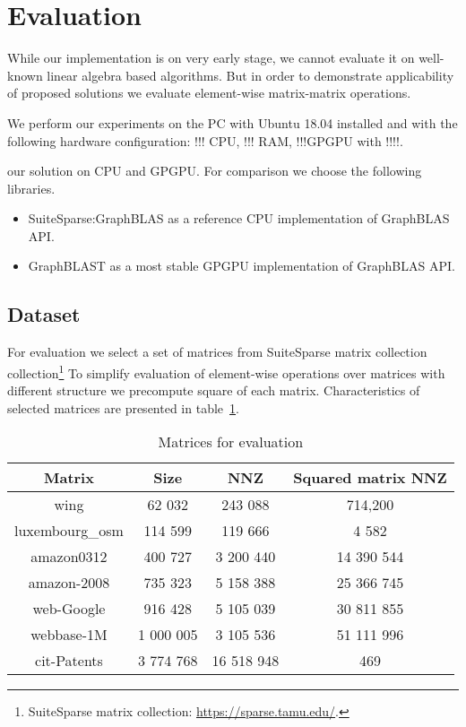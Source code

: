 \section{Evaluation}

While our implementation is on very early stage, we cannot evaluate it on well-known linear algebra based algorithms. 
But in order to demonstrate applicability of proposed solutions we evaluate element-wise matrix-matrix operations. 

We perform our experiments on the PC with Ubuntu 18.04 installed and with the following hardware configuration: !!! CPU, !!! RAM, !!!GPGPU with !!!!.

our solution on CPU and GPGPU.
For comparison we choose the following libraries.

\begin{itemize}
\item SuiteSparse:GraphBLAS as a reference CPU implementation of GraphBLAS API.
\item GraphBLAST as a most stable GPGPU implementation of GraphBLAS API.
\end{itemize}


\subsection {Dataset}

For evaluation we select a set of matrices from SuiteSparse matrix collection collection\footnote{SuiteSparse matrix collection: \url{https://sparse.tamu.edu/}.}
To simplify evaluation of element-wise operations over matrices with different structure we precompute square of each matrix. 
Characteristics of selected matrices are presented in table~\ref{matrices}.

\begin{table}[h]
    \centering
    \caption{Matrices for evaluation}
    \label{matrices}  
    \begin{tabular}{ | c || c | c | c | }
    \hline
    Matrix & Size & NNZ & Squared matrix NNZ \\ \hline
    \hline
    wing & 62 032 & 243 088 & 714,200 \\ \hline
    luxembourg\_osm & 114 599 & 119 666 & 4 582 \\ \hline
    amazon0312 & 400 727 & 3 200 440 & 14 390 544 \\ \hline
    amazon-2008 & 735 323 & 5 158 388 & 25 366 745 \\ \hline
    web-Google & 916 428 & 5 105 039 & 30 811 855 \\ \hline
    webbase-1M & 1 000 005 & 3 105 536 & 51 111 996 \\ \hline
    cit-Patents & 3 774 768 & 16 518 948 & 469 \\ \hline
    \end{tabular}
\end{table}

